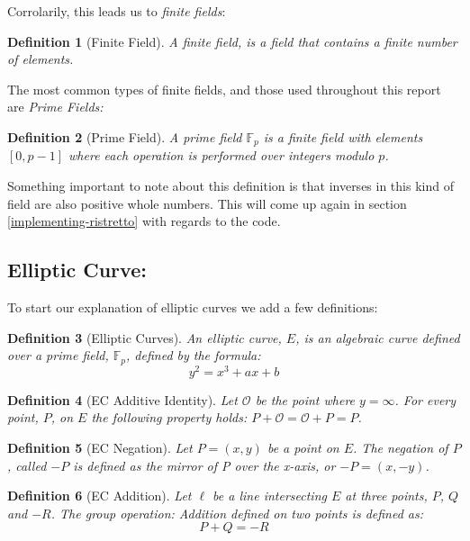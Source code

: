 \documentclass{article}
\newtheorem{definition}{Definition}[section]
\renewcommand{\O}{\mathcal{O}}
\newcommand{\F}{\mathbb{F}}
\begin{document}
Corrolarily, this leads us to \textit{finite fields}:

\begin{definition}[Finite Field]
	A finite field, is a field that contains a finite number of elements.
\end{definition}

The most common types of finite fields, and those used throughout this report are \textit{Prime Fields:} 

\begin{definition}[Prime Field]
	A prime field $\F_p$ is a finite field with elements $[0,p-1]$
	where each operation is performed over integers modulo $p$.
\end{definition}

Something important to note about this definition is that inverses in
this kind of field are also positive whole numbers. This will come up
again in section \ref{implementing-ristretto} with regards to the code.

\subsection{Elliptic Curve:}\label{elliptic-curves}

To start our explanation of elliptic curves we add a few definitions:

\begin{definition}[Elliptic Curves]
	An elliptic curve, $E$, is an algebraic curve defined over a prime field, $\F_p$, defined by the formula:
	$$y^2 = x^3 + ax + b$$
\end{definition}

\begin{definition}[EC Additive Identity]
	Let $\O$ be the point where $y = \infty$. For every point, $P$,
	on $E$ the following property holds:
	$P + \O = \O + P = P$.
\end{definition}

\begin{definition}[EC Negation]
	Let $P = (x,y)$ be a point on $E$. The negation of $P$, called $-P$
	is defined as the mirror of P over the x-axis, or $-P = (x,-y)$.
\end{definition}

\begin{definition}[EC Addition]
	Let $\ell$ be a line intersecting $E$ at three points, $P$, $Q$ and
	$-R$. The group operation: Addition defined on two points is defined
	as:
	$$P + Q = {-R}$$
\end{definition}
\end{document}

